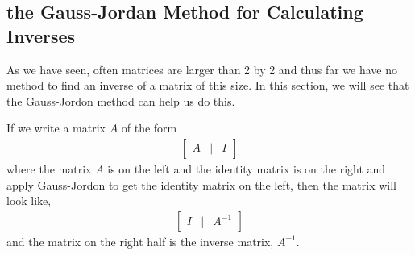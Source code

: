 \subsection{the Gauss-Jordan Method for Calculating Inverses}

As we have seen, often matrices are larger than 2 by 2 and thus far we have no method to find an inverse of a matrix of this size.  In this section, we will see that the Gauss-Jordon method can help us do this.


If we write a matrix $A$ of the form
%
\begin{align*}
\begin{bmatrix}
A & | & I
\end{bmatrix}
\end{align*}
where the matrix $A$ is on the left and the identity matrix is on the right and apply Gauss-Jordon to get the identity matrix on the left, then the matrix will look like,
%
\begin{align*}
\begin{bmatrix}
I & | & A^{-1}
\end{bmatrix}
\end{align*}
and the matrix on the right half is the inverse matrix, $A^{-1}$.

